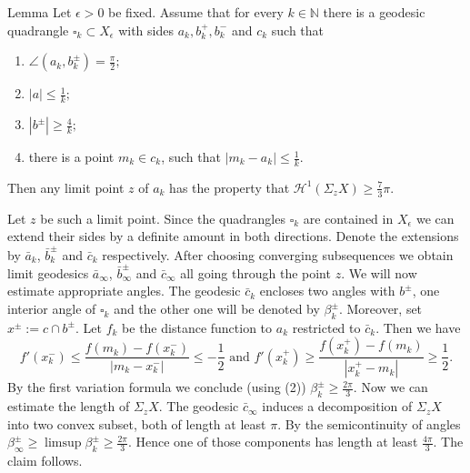 \documentclass[a4paper,10pt]{amsart}
\begin{document}
\begin{thm}{Lemma}
Let $\epsilon>0$ be fixed. Assume that for every $k\in\mathbb{N}$ there is a geodesic quadrangle $\square_k\subset X_\epsilon$ with
sides $a_k,b^+_k,b^-_k$ and $c_k$ such that
\begin{enumerate}
	\item $\angle(a_k,b^\pm_k)=\frac{\pi}{2};$
	\item $|a|\leq\frac{1}{k};$
	\item $|b^\pm|\geq \frac{4}{k};$
	\item there is a point $m_k\in c_k$, such that $|m_k-a_k|\leq \frac{1}{k}.$
\end{enumerate}
Then any limit point $z$ of  $a_k$ has the property that $\mathcal{H}^1(\Sigma_z X)\geq \frac{7}{3}\pi$.
\end{thm}
Let $z$ be such a limit point. Since the quadrangles $\square_k$ are contained in $X_\epsilon$  we can extend their sides 
by a definite amount in both directions. Denote the extensions by $\bar a_k$, $\bar b^\pm_k$ and $\bar c_k$ respectively.
After choosing converging subsequences we obtain limit geodesics $\bar a_\infty$, $\bar b^\pm_\infty$ and $\bar c_\infty$
all going through the point $z$. We will now estimate appropriate angles. The geodesic $\bar c_k$ encloses two angles with
$b^\pm$, one interior angle of $\square_k$ and the other one will be denoted by $\beta^\pm_k$. Moreover, set $x^\pm:=c\cap b^\pm$.
Let $f_k$ be the distance function to $a_k$ restricted to $\bar c_k$. Then we have 
$$
f'(x_k^-)\leq\frac{f(m_k)-f(x_k^-)}{|m_k-x_k^-|}\leq-\frac{1}{2}\text{  and  }f'(x_k^+)\geq\frac{f(x_k^+)-f(m_k)}{|x_k^+-m_k|}\geq\frac{1}{2}.
$$
By the first variation formula we conclude (using (2)) $\beta_k^\pm\geq\frac{2\pi}{3}$. Now we can estimate the length of
$\Sigma_z X$. The geodesic $\bar c_\infty$ induces a decomposition of $\Sigma_z X$ into two convex subset, both of length at least $\pi$.
By the semicontinuity of angles $\beta^\pm_\infty\geq\limsup \beta_k^\pm\geq\frac{2\pi}{3}$. Hence one of those components has length at least
$\frac{4\pi}{3}$. The claim follows. 
\qeds
\end{document}
